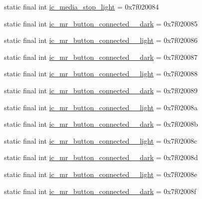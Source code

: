 \begin{CompactItemize}
\item 
static final int \hyperlink{classandroid_1_1support_1_1v7_1_1recyclerview_1_1_r_1_1drawable_b00a2a2e69921eb2491cda7bb4e0e042}{ic\_\-media\_\-stop\_\-light} = 0x7f020084
\item 
static final int \hyperlink{classandroid_1_1support_1_1v7_1_1recyclerview_1_1_r_1_1drawable_ce13634cbb644162a0fe65a03ba7bc8f}{ic\_\-mr\_\-button\_\-connected\_\_\-dark} = 0x7f020085
\item 
static final int \hyperlink{classandroid_1_1support_1_1v7_1_1recyclerview_1_1_r_1_1drawable_eca1624b013995a088b1a298c625f8ce}{ic\_\-mr\_\-button\_\-connected\_\_\-light} = 0x7f020086
\item 
static final int \hyperlink{classandroid_1_1support_1_1v7_1_1recyclerview_1_1_r_1_1drawable_634ccf03b16abbb5899509762cc0778c}{ic\_\-mr\_\-button\_\-connected\_\_\-dark} = 0x7f020087
\item 
static final int \hyperlink{classandroid_1_1support_1_1v7_1_1recyclerview_1_1_r_1_1drawable_d6be4aa841ba06d2bbd396b8789312ba}{ic\_\-mr\_\-button\_\-connected\_\_\-light} = 0x7f020088
\item 
static final int \hyperlink{classandroid_1_1support_1_1v7_1_1recyclerview_1_1_r_1_1drawable_c3f0342c571a1d75f88a77536cb401cd}{ic\_\-mr\_\-button\_\-connected\_\_\-dark} = 0x7f020089
\item 
static final int \hyperlink{classandroid_1_1support_1_1v7_1_1recyclerview_1_1_r_1_1drawable_d40215f34f631c977527c9e8b4acd56d}{ic\_\-mr\_\-button\_\-connected\_\_\-light} = 0x7f02008a
\item 
static final int \hyperlink{classandroid_1_1support_1_1v7_1_1recyclerview_1_1_r_1_1drawable_02d3be7b9465ef4dae4195dd2bcfb661}{ic\_\-mr\_\-button\_\-connected\_\_\-dark} = 0x7f02008b
\item 
static final int \hyperlink{classandroid_1_1support_1_1v7_1_1recyclerview_1_1_r_1_1drawable_279f96bb7a5ec5b73d1f5d50e73a4102}{ic\_\-mr\_\-button\_\-connected\_\_\-light} = 0x7f02008c
\item 
static final int \hyperlink{classandroid_1_1support_1_1v7_1_1recyclerview_1_1_r_1_1drawable_e1054c9075413026c3dfea5182c80870}{ic\_\-mr\_\-button\_\-connected\_\_\-dark} = 0x7f02008d
\item 
static final int \hyperlink{classandroid_1_1support_1_1v7_1_1recyclerview_1_1_r_1_1drawable_c53e27b60506272ec0f48c18b921cc5f}{ic\_\-mr\_\-button\_\-connected\_\_\-light} = 0x7f02008e
\item 
static final int \hyperlink{classandroid_1_1support_1_1v7_1_1recyclerview_1_1_r_1_1drawable_eebd875f52e2fa127619674704db6cf8}{ic\_\-mr\_\-button\_\-connected\_\_\-dark} = 0x7f02008f

\end{CompactItemize}
